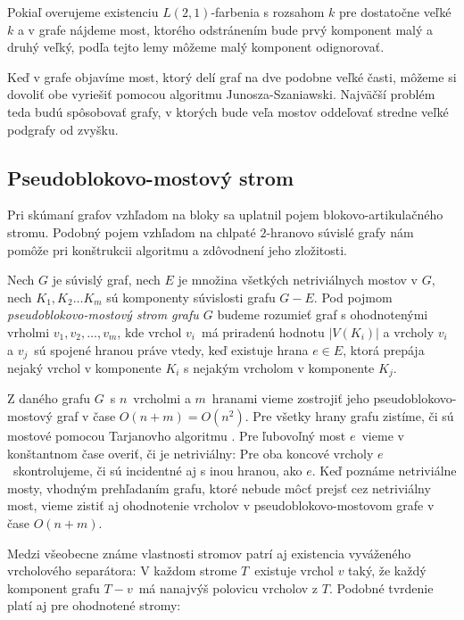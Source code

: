 Pokiaľ overujeme existenciu $L(2,1)$-farbenia s rozsahom $k$ pre dostatočne veľké $k$ a v grafe
nájdeme most, ktorého odstránením bude prvý komponent malý a druhý veľký, podľa tejto lemy
môžeme malý komponent odignorovať.

Keď v grafe objavíme most, ktorý delí graf na dve podobne veľké časti, môžeme si dovoliť
obe vyriešiť pomocou algoritmu Junosza-Szaniawski. Najväčší problém teda budú spôsobovať
grafy, v ktorých bude veľa mostov oddeľovať stredne veľké podgrafy od zvyšku.

\subsection{Pseudoblokovo-mostový strom}

Pri skúmaní grafov vzhľadom na bloky sa uplatnil pojem blokovo-artikulačného stromu.
Podobný pojem vzhľadom na chlpaté $2$-hranovo súvislé grafy nám pomôže pri konštrukcii
algoritmu a zdôvodnení jeho zložitosti.

\begin{defn}
    Nech $G$ je súvislý graf, nech $E$ je množina všetkých netriviálnych mostov v $G$, nech
    $K_1, K_2 \ldots K_m$ sú komponenty súvislosti grafu $G - E$. Pod pojmom \emph{pseudoblokovo-mostový
    strom grafu $G$} budeme rozumieť graf s ohodnotenými vrholmi $v_1, v_2, \ldots, v_m$, kde
    vrchol $v_i$ má priradenú hodnotu $|V(K_i)|$ a vrcholy $v_i$ a $v_j$ sú spojené hranou
    práve vtedy, keď existuje hrana $e \in E$, ktorá prepája nejaký vrchol v komponente $K_i$
    s nejakým vrcholom v komponente $K_j$.
\end{defn}

Z daného grafu $G$ s $n$ vrcholmi a $m$ hranami vieme zostrojiť jeho pseudoblokovo-mostový graf 
v čase $O(n+m) = O(n^2)$. Pre všetky hrany grafu zistíme, či sú mostové pomocou Tarjanovho
algoritmu \cite{tarjan_bridge}. Pre ľubovoľný most $e$ vieme v konštantnom čase overiť, či je
netriviálny: Pre oba koncové vrcholy $e$ skontrolujeme, či sú incidentné aj s inou hranou, ako $e$.
Keď poznáme netriviálne mosty, vhodným prehľadaním grafu, ktoré nebude môcť prejsť cez netriviálny most,
vieme zistiť aj ohodnotenie vrcholov v pseudoblokovo-mostovom grafe v čase $O(n+m)$.

Medzi všeobecne známe vlastnosti stromov patrí aj existencia vyváženého vrcholového separátora:
V každom strome $T$ existuje vrchol $v$ taký, že každý komponent grafu $T-v$ má nanajvýš polovicu
vrcholov z $T$. Podobné tvrdenie platí aj pre ohodnotené stromy:

